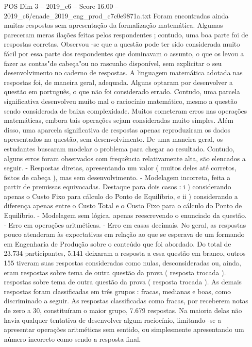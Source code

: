 \begin{textsample}{POS Dim 3 – 2019\_c6 – Score 16.00 – 2019\_c6/enade\_2019\_eng\_prod\_c7c0e9871a.txt}
Foram encontradas ainda muitas respostas sem apresentação da formalização matemática.
Algumas pareceram meras ilações feitas pelos respondentes ; contudo, uma boa parte foi de respostas corretas.
Observou -se que a questão pode ter sido considerada muito fácil por essa parte dos respondentes que dominavam o assunto, o que os levou a fazer as contas"de cabeça"ou no rascunho disponível, sem explicitar o seu desenvolvimento no caderno de respostas.
A linguagem matemática adotada nas respostas foi, de maneira geral, adequada.
Alguns optaram por desenvolver a questão em português, o que não foi considerado errado.
Contudo, uma parcela significativa desenvolveu muito mal o raciocínio matemático, mesmo a questão sendo considerada de baixa complexidade.
Muitos cometeram erros nas operações matemáticas, embora tais operações sejam consideradas muito simples.
Além disso, uma aparcela significativa de respostas apenas reproduziram os dados apresentados na questão, sem desenvolvimento.
De uma maneira geral, os estudantes buscaram modelar o problema para chegar ao resultado.
Contudo, alguns erros foram observados com frequência relativamente alta, são elencados a seguir. - Respostas diretas, apresentando um valor ( muitos deles até corretos, feitos de cabeça ), mas sem desenvolvimento. - Modelagem incorreta, feita a partir de premissas equivocadas.
Destaque para dois casos : i ) considerando apenas o Custo Fixo para cálculo do Ponto de Equilíbrio, e ii ) considerando a diferença apenas entre o Custo Total e o Custo Fixo para o cálculo do Ponto de Equilíbrio. - Modelagem sem lógica, apenas reescrevendo o enunciado da questão. - Erro em operações aritméticas. - Erro em casas decimais.
No geral, as respostas pouco atenderam às expectativas em relação ao que se esperava de um formando em Engenharia de Produção sobre o conteúdo que foi abordado.
Do total de 23.734 participantes, 5.141 deixaram a resposta a essa questão em branco, outros 155 tiveram suas respostas consideradas como nulas, desconsideradas ou, ainda, eram respostas sobre tema de outra questão da prova ( resposta trocada ). respostas sobre tema de outra questão da prova ( resposta trocada ).
As demais respostas foram classificadas em três grupos : fracas, medianas e boas, como discriminado a seguir.
As respostas classificadas como fracas, por receberem notas de zero a 30, constituíram o maior grupo, 7.679 respostas.
Na maioria delas não havia qualquer tentativa de desenvolver algum raciocínio, limitando -se a apresentar operações aritméticas sem sentido, ou simplesmente apresentando um número incorreto como sendo a resposta final.

\end{textsample}
